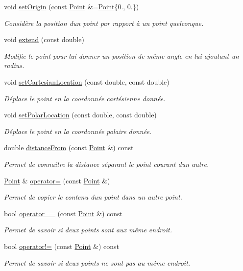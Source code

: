 \begin{DoxyCompactItemize}
void \hyperlink{classPoint_aab46bd6d93ccf0e90d3c4676d5cd40d1}{set\+Origin} (const \hyperlink{classPoint}{Point} \&=\hyperlink{classPoint}{Point}\{0., 0.\})
\begin{DoxyCompactList}\small\item\em Considère la position d\textquotesingle{}un point par rapport à un point quelconque. \end{DoxyCompactList}\item 
void \hyperlink{classPoint_a8e18fe044163b18acaefcda0a36b8fa3}{extend} (const double)
\begin{DoxyCompactList}\small\item\em Modifie le point pour lui donner un position de même angle en lui ajoutant un radius. \end{DoxyCompactList}\item 
void \hyperlink{classPoint_a292f3e944f1e11d1147480868ac01e99}{set\+Cartesian\+Location} (const double, const double)
\begin{DoxyCompactList}\small\item\em Déplace le point en la coordonnée cartésienne donnée. \end{DoxyCompactList}\item 
void \hyperlink{classPoint_a17a63e4dcb905423c0630ee127fffcae}{set\+Polar\+Location} (const double, const double)
\begin{DoxyCompactList}\small\item\em Déplace le point en la coordonnée polaire donnée. \end{DoxyCompactList}\item 
double \hyperlink{classPoint_ad3f543f2b8cd6a61399a3992e48769e0}{distance\+From} (const \hyperlink{classPoint}{Point} \&) const 
\begin{DoxyCompactList}\small\item\em Permet de connaitre la distance séparant le point courant d\textquotesingle{}un autre. \end{DoxyCompactList}\item 
\hyperlink{classPoint}{Point} \& \hyperlink{classPoint_aecfc6968998d806384e24cd93072b024}{operator=} (const \hyperlink{classPoint}{Point} \&)
\begin{DoxyCompactList}\small\item\em Permet de copier le contenu d\textquotesingle{}un point dans un autre point. \end{DoxyCompactList}\item 
bool \hyperlink{classPoint_aacbb5ae0d9898c4648e9d49441c029ce}{operator==} (const \hyperlink{classPoint}{Point} \&) const 
\begin{DoxyCompactList}\small\item\em Permet de savoir si deux points sont aux même endroit. \end{DoxyCompactList}\item 
bool \hyperlink{classPoint_a627f69d792993405c27b64387c77432b}{operator!=} (const \hyperlink{classPoint}{Point} \&) const 
\begin{DoxyCompactList}\small\item\em Permet de savoir si deux points ne sont pas au même endroit. \end{DoxyCompactList}\end{DoxyCompactItemize}
